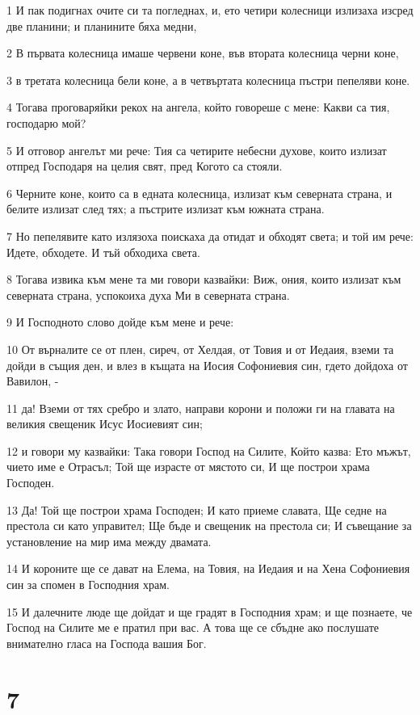 \par 1 И пак подигнах очите си та погледнах, и, ето четири колесници излизаха изсред две планини; и планините бяха медни,
\par 2 В първата колесница имаше червени коне, във втората колесница черни коне,
\par 3 в третата колесница бели коне, а в четвъртата колесница пъстри пепеляви коне.
\par 4 Тогава проговаряйки рекох на ангела, който говореше с мене: Какви са тия, господарю мой?
\par 5 И отговор ангелът ми рече: Тия са четирите небесни духове, които излизат отпред Господаря на целия свят, пред Когото са стояли.
\par 6 Черните коне, които са в едната колесница, излизат към северната страна, и белите излизат след тях; а пъстрите излизат към южната страна.
\par 7 Но пепелявите като излязоха поискаха да отидат и обходят света; и той им рече: Идете, обходете. И тъй обходиха света.
\par 8 Тогава извика към мене та ми говори казвайки: Виж, ония, които излизат към северната страна, успокоиха духа Ми в северната страна.
\par 9 И Господното слово дойде към мене и рече:
\par 10 От върналите се от плен, сиреч, от Хелдая, от Товия и от Иедаия, вземи та дойди в същия ден, и влез в къщата на Иосия Софониевия син, гдето дойдоха от Вавилон, -
\par 11 да! Вземи от тях сребро и злато, направи корони и положи ги на главата на великия свещеник Исус Иосиевият син;
\par 12 и говори му казвайки: Така говори Господ на Силите, Който казва: Ето мъжът, чието име е Отрасъл; Той ще израсте от мястото си, И ще построи храма Господен.
\par 13 Да! Той ще построи храма Господен; И като приеме славата, Ще седне на престола си като управител; Ще бъде и свещеник на престола си; И съвещание за установление на мир има между двамата.
\par 14 И короните ще се дават на Елема, на Товия, на Иедаия и на Хена Софониевия син за спомен в Господния храм.
\par 15 И далечните люде ще дойдат и ще градят в Господния храм; и ще познаете, че Господ на Силите ме е пратил при вас. А това ще се сбъдне ако послушате внимателно гласа на Господа вашия Бог.

\chapter{7}

